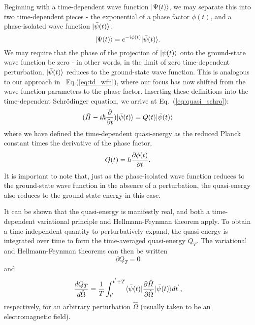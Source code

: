 {{{Beginning with a time-dependent wave function $| \Psi(t) \rangle$, we may separate this into two time-dependent pieces - the exponential of a phase factor $\phi(t)$, and a phase-isolated wave function $| \bar\psi(t) \rangle$:
\begin{equation} \label{total_psi}
    | \Psi(t) \rangle = e^{-i\phi(t)}| \bar\psi(t) \rangle.
\end{equation}
We may require that the phase of the projection of $| \bar\psi(t) \rangle$ onto the ground-state wave function be 
zero - in other words, in the limit of zero time-dependent perturbation, $| \bar\psi(t) \rangle$ reduces to the
ground-state wave function. This is analogous to our approach in ~Eq.(\ref{eq:td_wfn}), where our focus has
now shifted from the wave function parameters to the phase factor.
Inserting these definitions into the time-dependent Schr\"odinger equation,
we arrive at Eq.~(\ref{eq:quasi_schro}):
\begin{equation} \label{eq:quasi_schro}
    (\hat{H} - i\hbar \frac{\partial}{\partial t})| \bar\psi(t) \rangle = Q(t)| \bar\psi(t) \rangle
\end{equation}
where we have defined the time-dependent quasi-energy as the reduced Planck constant times the derivative
of the phase factor,
\begin{equation} \label{eq:quasi_e}
    Q(t) = \hbar\frac{\partial\phi(t)}{\partial t}.
\end{equation}
It is important to note that, just as the phase-isolated wave function reduces to the ground-state wave function in the absence of a perturbation, the quasi-energy also reduces to the ground-state energy in this case. 

It can be shown that the quasi-energy is manifestly real, and both a time-dependent variational 
principle and Hellmann-Feynman theorem apply.\cite{Norman2011} To obtain a time-independent 
quantity to perturbatively expand, the quasi-energy is integrated over time to form the 
time-averaged quasi-energy $Q_T$. The variational and Hellmann-Feynman theorems can then be written
\begin{equation} \label{eq:var}
    \partial Q_T = 0
\end{equation}
and
\begin{equation} \label{eq:hf-theorem}
    \frac{dQ_T}{d\hat\Omega} = \frac{1}{T}\int_{t^{'}}^{t^{'}+T}\langle\bar\psi(t) |\frac{\partial \hat{H}}{\partial\hat\Omega}| \bar\psi(t) \rangle dt^{'},
\end{equation}
respectively, for an arbitrary perturbation $\hat\Omega$ (usually taken to be an electromagnetic field).

}}}
